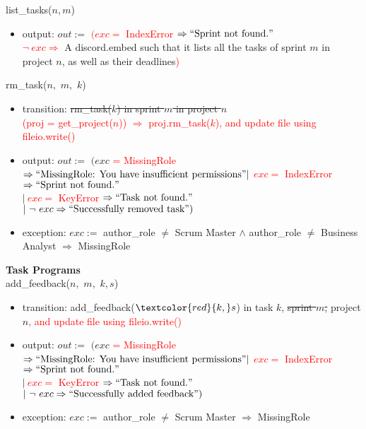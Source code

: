 \documentclass[12pt, titlepage]{article}
\begin{document}
\noindent list\_tasks($n, m$)
\begin{itemize}
    \item output: $out :=$ \textcolor{red}{$(exc =$ IndexError $\Rightarrow ``\text{Sprint not found.}"$\\$ \lnot\ exc \Rightarrow$} A discord.embed such that it lists all the tasks of sprint $m$ in project $n$, as well as their deadlines\textcolor{red}{)}
\end{itemize}

\noindent rm\_task($n,$ \sout{$m,$} $k$)
\begin{itemize}
    \item transition: \sout{rm\_task($k$) in sprint $m$ in project $n$}\\\textcolor{red}{(proj = get\_project($n$)) $\Rightarrow$ proj.rm\_task($k$)}\textcolor{red}{, and update file using fileio.write()}
    \item output: $out :=$ $(exc$ \textcolor{red}{= MissingRole} $\Rightarrow ``\text{MissingRole: You have insufficient permissions}"\\ |\ $\textcolor{red}{$exc =$ IndexError $\Rightarrow ``\text{Sprint not found.}"$}\\$|\ $\textcolor{red}{$exc =$ KeyError $\Rightarrow ``\text{Task not found.}"$}\\$|\ \lnot\ exc \Rightarrow ``\text{Successfully removed task}")$
    \item exception: $exc :=$ author\_role $\neq$ Scrum Master $\land$ author\_role $\neq$ Business Analyst $\Rightarrow$ MissingRole
\end{itemize}

\noindent \textbf{Task Programs\\}
\noindent add\_feedback($n,$ \sout{$m,$} $k, s$)
\begin{itemize}
    \item transition: add\_feedback($\textcolor{red}{k,} s$) in task $k$, \sout{sprint $m$,} project $n$\textcolor{red}{, and update file using fileio.write()}
    
    \item output: $out :=$ $(exc$ \textcolor{red}{= MissingRole} $\Rightarrow ``\text{MissingRole: You have insufficient permissions}"\\ |\ $\textcolor{red}{$exc =$ IndexError $\Rightarrow ``\text{Sprint not found.}"$}\\$|\ $\textcolor{red}{$exc =$ KeyError $\Rightarrow ``\text{Task not found.}"$}\\$|\ \lnot\ exc \Rightarrow ``\text{Successfully added feedback}")$
    
    \item exception: $exc :=$ author\_role $\neq$ Scrum Master $\Rightarrow$ MissingRole
\end{itemize}
\end{document}
